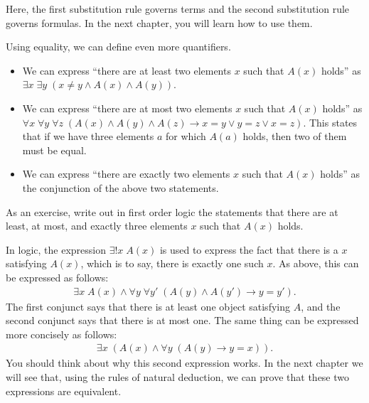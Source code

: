 \documentclass[letterpaper,10pt,english]{sphinxmanual}
\begin{document}
\sphinxAtStartPar
Here, the first substitution rule governs terms and the second substitution rule governs formulas. In the next chapter, you will learn how to use them.

\sphinxAtStartPar
Using equality, we can define even more quantifiers.
\begin{itemize}
\item {} 
\sphinxAtStartPar
We can express “there are at least two elements \(x\) such that \(A(x)\) holds” as \(\exists x \; \exists y \; (x \neq y \wedge A(x) \wedge A(y))\).

\item {} 
\sphinxAtStartPar
We can express “there are at most two elements \(x\) such that \(A(x)\) holds” as \(\forall x \; \forall y \; \forall z \; (A(x) \wedge A(y) \wedge A(z) \to x = y \vee y = z \vee x = z)\). This states that if we have three elements \(a\) for which \(A(a)\) holds, then two of them must be equal.

\item {} 
\sphinxAtStartPar
We can express “there are exactly two elements \(x\) such that \(A(x)\) holds” as the conjunction of the above two statements.

\end{itemize}

\sphinxAtStartPar
As an exercise, write out in first order logic the statements that there are at least, at most, and exactly three elements \(x\) such that \(A(x)\) holds.

\sphinxAtStartPar
In logic, the expression \(\exists!x \; A(x)\) is used to express the fact that there is a  \(x\) satisfying \(A(x)\), which is to say, there is exactly one such \(x\). As above, this can be expressed as follows:
\begin{equation*}
\begin{split}\exists x \; A(x) \wedge \forall y \; \forall {y'} \; (A(y) \wedge A(y') \to y = y').\end{split}
\end{equation*}
\sphinxAtStartPar
The first conjunct says that there is at least one object satisfying \(A\), and the second conjunct says that there is at most one. The same thing can be expressed more concisely as follows:
\begin{equation*}
\begin{split}\exists x \; (A(x) \wedge \forall y \; (A(y) \to y = x)).\end{split}
\end{equation*}
\sphinxAtStartPar
You should think about why this second expression works. In the next chapter we will see that, using the rules of natural deduction, we can prove that these two expressions are equivalent.
\end{document}
